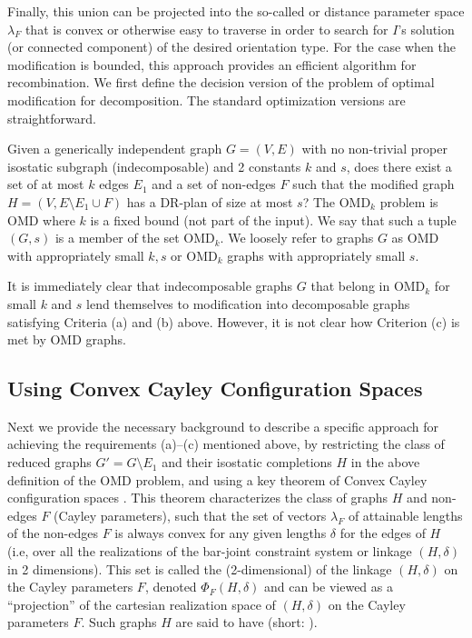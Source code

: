 \medskip\noindent
{}
Finally, this union can be projected into the so-called  or distance parameter space $\lambda_F$ that is convex or otherwise easy to traverse in order to search for $I$'s solution (or connected component) of the desired orientation type. For the case when the modification is bounded, this approach provides an efficient algorithm for recombination. We first define the decision version of the problem of optimal modification for decomposition. The standard optimization versions are straightforward.


Given a generically independent graph $G = (V,E)$ with no non-trivial proper isostatic subgraph (indecomposable) and 2 constants $k$ and $s$, does there exist a set of at most $k$  edges $E_1$ and a set of non-edges $F$ such that the modified graph $H = (V, E\setminus E_1 \cup F)$ has a DR-plan of size at most $s$?  The OMD$_k$ problem is  OMD where $k$ is a fixed bound (not part of the input).   We say that such a tuple $(G,s)$ is a member of the set OMD$_k$. We loosely refer to graphs $G$ as OMD with appropriately small $k,s$ or OMD$_k$ graphs with appropriately small $s$.


It is immediately clear that indecomposable graphs $G$ that belong in OMD$_k$ for small $k$ and $s$  lend themselves to modification  into decomposable graphs satisfying Criteria (a) and (b) above. However, it is not clear how Criterion (c) is met by OMD graphs.






\subsection{Using Convex Cayley Configuration Spaces}
\label{sec:2-tree-reduction}
%
Next we provide the necessary background to describe a specific approach for achieving the requirements (a)--(c) mentioned above, by restricting the class of reduced graphs $G' = G\setminus E_1$ and their isostatic completions $H$ in the above definition of the OMD problem, and using a key theorem of Convex Cayley configuration spaces \cite{sitharam2010convex}. This theorem characterizes the class of graphs $H$ and non-edges $F$ (Cayley parameters), such that the set of vectors $\lambda_F$ of  attainable lengths of the non-edges $F$ is always convex for any given lengths $\delta$ for the edges of $H$ (i.e, over all the realizations of the bar-joint constraint system or linkage $(H,\delta)$ in 2 dimensions). This set is called the (2-dimensional)  of the linkage $(H,\delta)$ on the Cayley parameters $F$, denoted $\Phi_F(H,\delta)$ and can be viewed as a ``projection'' of the cartesian realization space of $(H,\delta)$ on the Cayley parameters $F$. Such graphs $H$ are said to have  (short: ).

